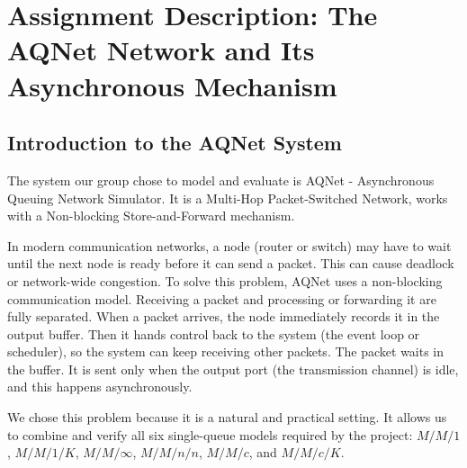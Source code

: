 \section{Assignment Description: The AQNet Network and Its Asynchronous Mechanism}

\subsection{Introduction to the AQNet System}
The system our group chose to model and evaluate is AQNet - Asynchronous Queuing Network Simulator. It is a Multi-Hop Packet-Switched Network, works with a Non-blocking Store-and-Forward mechanism.

In modern communication networks, a node (router or switch) may have to wait until the next node is ready before it can send a packet. This can cause deadlock or network-wide congestion. To solve this problem, AQNet uses a non-blocking communication model. Receiving a packet and processing or forwarding it are fully separated. When a packet arrives, the node immediately records it in the output buffer. Then it hands control back to the system (the event loop or scheduler), so the system can keep receiving other packets. The packet waits in the buffer. It is sent only when the output port (the transmission channel) is idle, and this happens asynchronously.

We chose this problem because it is a natural and practical setting. It allows us to combine and verify all six single-queue models required by the project: $M/M/1$, $M/M/1/K$, $M/M/\infty$, $M/M/n/n$, $M/M/c$, and $M/M/c/K$.


